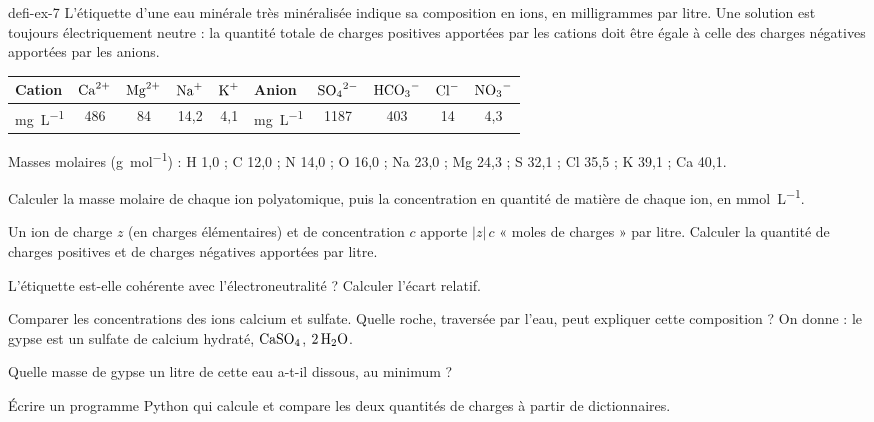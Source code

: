 \begin{blocEdition}{defi-ex-7}
L'étiquette d'une eau minérale très minéralisée indique sa composition en ions, en milligrammes par litre. Une solution est
toujours électriquement neutre : la quantité totale de charges positives apportées par les cations doit être égale à celle
des charges négatives apportées par les anions.
\begin{center}
\begin{tabular}{lcccc@{\qquad}lcccc}
\toprule
Cation & $\ce{Ca^{2+}}$ & $\ce{Mg^{2+}}$ & $\ce{Na+}$ & $\ce{K+}$ & Anion & $\ce{SO4^{2-}}$ & $\ce{HCO3-}$ & $\ce{Cl-}$ & $\ce{NO3-}$ \\
\midrule
\unit{mg.L^{-1}} & 486 & 84 & 14,2 & 4,1 & \unit{mg.L^{-1}} & 1187 & 403 & 14 & 4,3 \\
\bottomrule
\end{tabular}
\end{center}
Masses molaires (\unit{g.mol^{-1}}) : H 1,0 ; C 12,0 ; N 14,0 ; O 16,0 ; Na 23,0 ; Mg 24,3 ; S 32,1 ; Cl 35,5 ; K 39,1 ; Ca 40,1.
\begin{questions}
\item Calculer la masse molaire de chaque ion polyatomique, puis la concentration en quantité de matière de chaque ion,
en \unit{mmol.L^{-1}}.
\item Un ion de charge $z$ (en charges élémentaires) et de concentration $c$ apporte $|z|\,c$ « moles de charges » par litre.
Calculer la quantité de charges positives et de charges négatives apportées par litre.
\item L'étiquette est-elle cohérente avec l'électroneutralité ? Calculer l'écart relatif.
\item Comparer les concentrations des ions calcium et sulfate. Quelle roche, traversée par l'eau, peut expliquer cette
composition ? On donne : le gypse est un sulfate de calcium hydraté, $\ce{CaSO4}$, $2\,\ce{H2O}$.
\item Quelle masse de gypse un litre de cette eau a-t-il dissous, au minimum ?
\item Écrire un programme Python qui calcule et compare les deux quantités de charges à partir de dictionnaires.
\end{questions}
\end{blocEdition}

